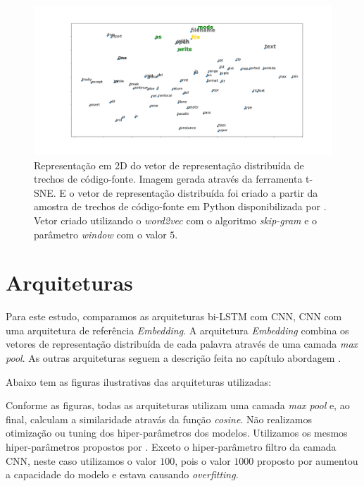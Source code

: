 
\begin{figure}[h]
\includegraphics[width=1\textwidth]{figuras/cap-trabalhos-relacionados/code-tsne-output.png}
\caption{Representação em 2D do vetor de representação distribuída de trechos de código-fonte. Imagem gerada através da ferramenta t-SNE. E o vetor de representação distribuída foi criado a partir da amostra de trechos de código-fonte em Python disponibilizada por \cite{yao-2018}. Vetor criado utilizando o \textit{word2vec} com o algoritmo \textit{skip-gram} e o parâmetro \textit{window} com o valor $5$.}
\label{fig:tsne-code-snippet-python}
\end{figure}

\section{Arquiteturas}

Para este estudo, comparamos as arquiteturas bi-LSTM com CNN, CNN com uma arquitetura de referência \textit{Embedding}. A arquitetura \textit{Embedding} combina os vetores de representação distribuída de cada palavra através de uma camada \textit{max pool}. As outras arquiteturas seguem a descrição feita no capítulo abordagem .

Abaixo tem as figuras ilustrativas das arquiteturas utilizadas:


Conforme as figuras, todas as arquiteturas utilizam uma camada \textit{max pool} e, ao final, calculam a similaridade atravás da função \textit{cosine}.
Não realizamos otimização ou tuning dos hiper-parâmetros dos modelos. Utilizamos os mesmos hiper-parâmetros propostos por \cite{tan-lstm-qa}. Exceto o hiper-parâmetro filtro da camada CNN, neste caso utilizamos o valor $100$, pois o valor $1000$ proposto por \cite{tan-lstm-qa} aumentou a capacidade do modelo e estava causando \textit{overfitting}.

